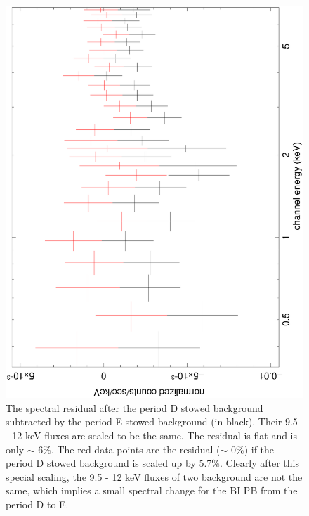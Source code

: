 \documentclass{aastex}
\begin{document}
\begin{figure}
\centerline{\includegraphics[height=0.45\linewidth,angle=270]{f24.ps}}
  \caption{The spectral residual after the period D stowed background subtracted by the
period E stowed background (in black). Their 9.5 - 12 keV fluxes are scaled to be the same.
The residual is flat and is only $\sim$ 6\%. The red data points are
the residual ($\sim$ 0\%) if the period D stowed background is scaled up by 5.7\%.
Clearly after this special scaling, the 9.5 - 12 keV fluxes of two background are not the same,
which implies a small spectral change for the BI PB from the period D to E.
}
\end{figure}
\end{document}

